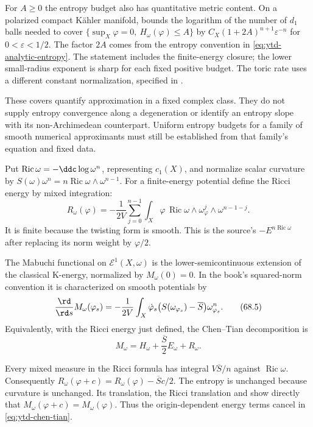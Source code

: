 For $A\geq0$ the entropy budget also has quantitative metric content.
On a polarized
compact K\"ahler manifold, 
bounds the logarithm of the number of $d_1$ balls needed to cover
$\{\sup_X\varphi=0,\ H_\omega(\varphi)\leq A\}$ by
$C_X(1+2A)^{n+1}\varepsilon^{-n}$ for $0<\varepsilon<1/2$.
The factor $2A$ comes from the entropy convention in
\eqref{eq:ytd-analytic-entropy}. The statement includes the
finite-energy closure; the lower small-radius exponent is sharp for
each fixed positive budget. The toric rate uses a different
constant normalization, specified in
.

These covers quantify approximation in a fixed complex class. They
do not supply entropy convergence along a degeneration or identify
an entropy slope with its non-Archimedean counterpart. Uniform
entropy budgets for a family of smooth numerical approximants must
still be established from that family's equation and fixed data.

Put $\operatorname{Ric}\omega=-\ddc\log\omega^n$, representing $c_1(X)$,
and normalize scalar curvature by
$S(\omega)\omega^n=n\operatorname{Ric}\omega\wedge\omega^{n-1}$.
For a finite-energy potential define the Ricci energy by mixed integration:
\[
 R_\omega(\varphi)
 =-\frac1{2V}\sum_{j=0}^{n-1}
   \int_X\varphi\,\operatorname{Ric}\omega\wedge
        \omega_\varphi^j\wedge\omega^{n-1-j}.
\tag{68.4a}\label{eq:ytd-analytic-ricci-energy}
\]
It is finite because the twisting form is smooth. This is the source's
$-E^{n\operatorname{Ric}\omega}$ after replacing its norm weight by
$\varphi/2$.

\begin{definition}
\label{def:ytd-analytic-mabuchi}
The Mabuchi functional on $\mathcal E^1(X,\omega)$ is the
lower-semicontinuous extension of the classical K-energy, normalized
by $M_\omega(0)=0$.  In the book's squared-norm convention it is
characterized on smooth potentials by
\[
 \frac{\rd}{\rd s}M_\omega(\varphi_s)
   =-\frac{1}{2V}\int_X
      \dot\varphi_s
      \bigl(S(\omega_{\varphi_s})-\overline S\bigr)
      \omega_{\varphi_s}^n.
\tag{68.5}\label{eq:ytd-mabuchi-variation}
\]
Equivalently, with the Ricci energy just defined, the Chen--Tian
decomposition is
\[
             M_\omega
       =H_\omega+\frac{\overline S}{2}E_\omega+R_\omega.
\tag{68.5a}\label{eq:ytd-chen-tian}
\]
\end{definition}

\begin{remark}
\label{rem:ytd-mabuchi-translation}
Every mixed measure in the Ricci formula has integral
$V\overline S/n$ against $\operatorname{Ric}\omega$. Consequently
$R_\omega(\varphi+c)=R_\omega(\varphi)-\overline S c/2$.
The entropy is unchanged because curvature is unchanged. Its translation,
the Ricci translation and  show directly
that $M_\omega(\varphi+c)=M_\omega(\varphi)$. Thus the origin-dependent
energy terms cancel in \eqref{eq:ytd-chen-tian}.
\end{remark}


